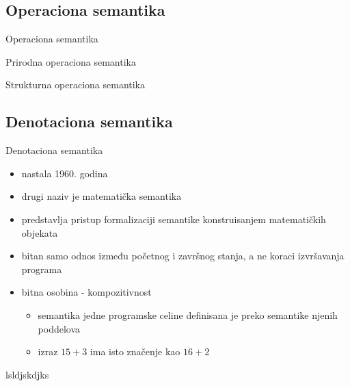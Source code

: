 \documentclass{beamer}
\begin{document}
\subsection{Operaciona semantika}
\begin{frame}{Operaciona semantika}
  
\end{frame}


\begin{frame}{Prirodna operaciona semantika}
  
\end{frame}

\begin{frame}{Strukturna operaciona semantika}
  
\end{frame}
\subsection{Denotaciona semantika}
\begin{frame}{Denotaciona semantika}
  \begin{itemize}
  \item nastala 1960. godina
  \item drugi naziv je matematička semantika
  \item predstavlja pristup formalizaciji semantike konstruisanjem matematičkih objekata 
  \item bitan samo odnos između početnog i završnog stanja, a ne koraci izvršavanja programa
   \item bitna osobina - kompozitivnost
   \begin{itemize}
   \item semantika jedne programske celine definisana je preko semantike njenih poddelova
   \item izraz $15 + 3$ ima isto značenje kao $16 + 2$
   \end{itemize}
   \end{itemize}
\end{frame}

\begin{frame}{lsldjskdjks}
  
\end{frame}
\end{document}
